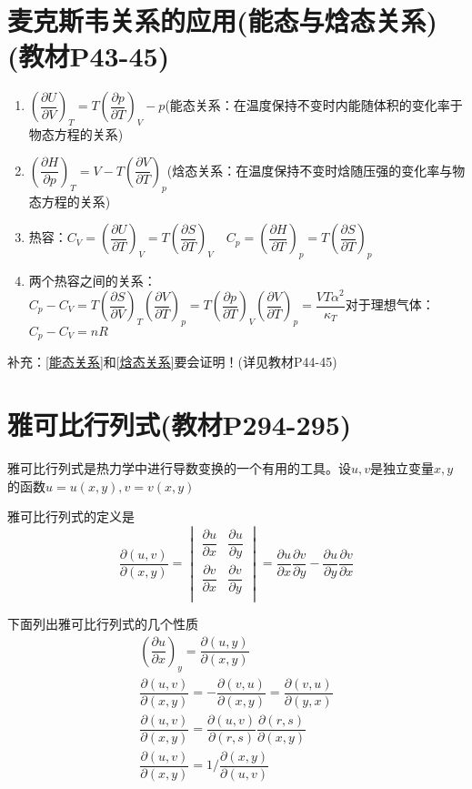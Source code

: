 \documentclass[oneside]{ctexbook}
\begin{document}
\section{麦克斯韦关系的应用(能态与焓态关系)(教材P43-45)}
\begin{enumerate}
    \item \(\left(\dfrac{\partial{}U}{\partial{}V}\right)_T=T\left(\dfrac{\partial{}p}{\partial{}T}\right)_V-p\)(能态关系：在温度保持不变时内能随体积的变化率于物态方程的关系)\label{能态关系}
    \item \(\left(\dfrac{\partial{}H}{\partial{}p}\right)_T=V-T\left(\dfrac{\partial{}V}{\partial{}T}\right)_p\)(焓态关系：在温度保持不变时焓随压强的变化率与物态方程的关系)\label{焓态关系}
    \item 热容：\(C_V=\left(\dfrac{\partial{}U}{\partial{}T}\right)_V=T\left(\dfrac{\partial{}S}{\partial{}T}\right)_V\quad{}C_p=\left(\dfrac{\partial{}H}{\partial{}T}\right)_p=T\left(\dfrac{\partial{}S}{\partial{}T}\right)_p\)
    \item 两个热容之间的关系：\(C_p-C_V=T\left(\dfrac{\partial{}S}{\partial{}V}\right)_T\left(\dfrac{\partial{}V}{\partial{}T}\right)_p=T\left(\dfrac{\partial{}p}{\partial{}T}\right)_V\left(\dfrac{\partial{}V}{\partial{}T}\right)_p=\dfrac{VT\alpha^2}{\kappa_T}\)对于理想气体：\(C_p-C_V=nR\)
\end{enumerate}

补充：\ref{能态关系}和\ref{焓态关系}要会证明！(详见教材P44-45)

\section{雅可比行列式(教材P294-295)}

雅可比行列式是热力学中进行导数变换的一个有用的工具。设\(u,v\)是独立变量\(x,y\)的函数\(u=u(x,y),v=v(x,y)\)

雅可比行列式的定义是
\begin{equation}
\dfrac{\partial(u,v)}{\partial{}(x,y)}=\begin{vmatrix}
\dfrac{\partial{}u}{\partial{}x}&\dfrac{\partial{}u}{\partial{}y}\\
    \dfrac{\partial{}v}{\partial{}x}&\dfrac{\partial{}v}{\partial{}y}\\
    \end{vmatrix}=\dfrac{\partial{}u}{\partial{}x}\dfrac{\partial{}v}{\partial{}y}-\dfrac{\partial{}u}{\partial{}y}\dfrac{\partial{}v}{\partial{}x}
\end{equation}

下面列出雅可比行列式的几个性质
\begin{gather*}
    \left(\dfrac{\partial{}u}{\partial{}x}\right)_y=\dfrac{\partial(u,y)}{\partial{}(x,y)}\\
    \dfrac{\partial(u,v)}{\partial{}(x,y)}=-\dfrac{\partial(v,u)}{\partial{}(x,y)}=\dfrac{\partial(v,u)}{\partial{}(y,x)}\\
    \dfrac{\partial(u,v)}{\partial{}(x,y)}=\dfrac{\partial(u,v)}{\partial{}(r,s)}\dfrac{\partial(r,s)}{\partial{}(x,y)}\\
    \dfrac{\partial(u,v)}{\partial{}(x,y)}=1/\dfrac{\partial(x,y)}{\partial{}(u,v)}
\end{gather*}
\end{document}
